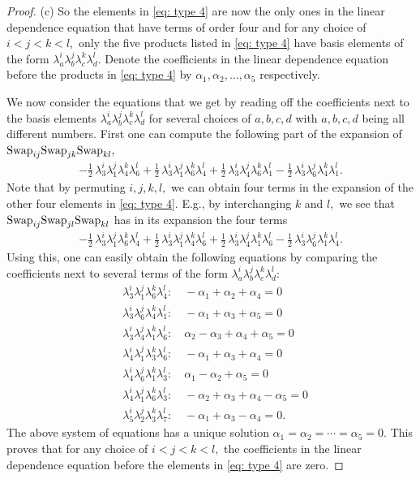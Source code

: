 \documentclass[12pt,dvipsnames,accepted=2016-08-18,a4paper,onecolumn]{quantumarticle}
\numberwithin{equation}{section}
\theoremstyle{definition}
\begin{document}
\begin{proof}
(c) So the elements in \eqref{eq: type 4} are now the only ones in the linear dependence equation that have terms of order four and for any choice of $i < j < k<l,$ only the five  products listed in \eqref{eq: type 4} have basis elements of the form $\lambda_a^i \lambda_b^j \lambda_c^k \lambda_d^l.$ Denote the coefficients in the linear dependence equation before the products in \eqref{eq: type 4} by $\alpha_1,\alpha_2,\ldots,\alpha_5$ respectively.

We now consider the equations that we get by reading off the coefficients next to the basis elements $\lambda_a^i \lambda_b^j \lambda_c^k \lambda_d^l$ for several choices of $a,b,c,d$ with $a,b,c,d$ being all different numbers. First one can compute the following part of the expansion of $\textnormal{Swap}_{ij} \textnormal{Swap}_{jk} \textnormal{Swap}_{kl},$
\begin{align*}
	-\frac12\, \lambda_3^i \lambda_1^j \lambda_4^k \lambda_6^l + \frac12\, \lambda_3^i \lambda_1^j \lambda_6^k \lambda_4^l + \frac12\,\lambda_3^i \lambda_4^j \lambda_6^k \lambda_1^l -\frac12\,\lambda_3^i \lambda_6^j \lambda_4^k \lambda_1^l.
\end{align*}
Note that by permuting $i,j,k,l,$ we can obtain four terms in the expansion of the other four elements in \eqref{eq: type 4}.
E.g., by interchanging $k$ and $l,$ we see that $\textnormal{Swap}_{ij} \textnormal{Swap}_{jl} \textnormal{Swap}_{kl}$ has in its expansion the four terms
\begin{align*}
	-\frac12\, \lambda_3^i \lambda_1^j \lambda_6^k \lambda_4^l + \frac12\, \lambda_3^i \lambda_1^j \lambda_4^k \lambda_6^l + \frac12\,\lambda_3^i \lambda_4^j \lambda_1^k \lambda_6^l -\frac12\,\lambda_3^i \lambda_6^j \lambda_1^k \lambda_4^l.
\end{align*}
Using this, one can easily obtain the following equations by comparing the coefficients next to several terms of the form $\lambda_a^i \lambda_b^j \lambda_c^k \lambda_d^l:$
\begin{align*}
	&\lambda_3^i \lambda_1^j \lambda_6^k \lambda_4^l : \quad -\alpha_1 + \alpha_2 + \alpha_4 = 0 \\
	&\lambda_3^i \lambda_6^j \lambda_4^k \lambda_1^l : \quad -\alpha_1 + \alpha_3 + \alpha_5 = 0 \\
	&\lambda_3^i \lambda_4^j \lambda_1^k \lambda_6^l : \quad \alpha_2-\alpha_3 + \alpha_4 + \alpha_5 = 0 \\
	&\lambda_4^i \lambda_1^j \lambda_3^k \lambda_6^l : \quad -\alpha_1 + \alpha_3 + \alpha_4 = 0 \\
	&\lambda_4^i \lambda_6^j \lambda_1^k \lambda_3^l : \quad \alpha_1 - \alpha_2 + \alpha_5 = 0 \\
	&\lambda_4^i \lambda_1^j \lambda_6^k \lambda_3^l : \quad -\alpha_2 + \alpha_3 + \alpha_4 -\alpha_5 = 0 \\
	&\lambda_5^i \lambda_2^j \lambda_3^k \lambda_7^l : \quad -\alpha_1 + \alpha_3 - \alpha_4 = 0.
\end{align*}
The above system of equations has a unique solution $\alpha_1=\alpha_2=\cdots=\alpha_5=0.$ This proves that for any choice of $i<j<k<l,$ the coefficients in the linear dependence equation before the elements in \eqref{eq: type 4} are zero.
 




\end{proof}
\end{document}
